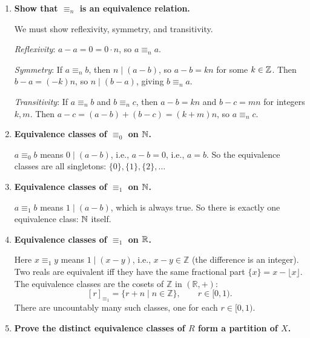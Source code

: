 \begin{enumerate}[{0.}1. ]
\begin{enumerate}
\item $\leq$ is $=\cup<$, which is the set computed in part (c).
\end{enumerate}

\item \textbf{Show that $\equiv_n$ is an equivalence relation.}

We must show reflexivity, symmetry, and transitivity.

\textit{Reflexivity}: $a - a = 0 = 0 \cdot n$, so $a \equiv_n a$.

\textit{Symmetry}: If $a \equiv_n b$, then $n \mid (a-b)$, so $a - b = kn$ for some $k \in \mathbb{Z}$. Then $b - a = (-k)n$, so $n \mid (b-a)$, giving $b \equiv_n a$.

\textit{Transitivity}: If $a \equiv_n b$ and $b \equiv_n c$, then $a - b = kn$ and $b - c = mn$ for integers $k,m$. Then $a - c = (a-b)+(b-c) = (k+m)n$, so $a \equiv_n c$.

\item \textbf{Equivalence classes of $\equiv_0$ on $\mathbb{N}$.}

$a \equiv_0 b$ means $0 \mid (a-b)$, i.e., $a - b = 0$, i.e., $a = b$. So the equivalence classes are all singletons: $\{0\}, \{1\}, \{2\}, \ldots$

\item \textbf{Equivalence classes of $\equiv_1$ on $\mathbb{N}$.}

$a \equiv_1 b$ means $1 \mid (a - b)$, which is always true. So there is exactly one equivalence class: $\mathbb{N}$ itself.

\item \textbf{Equivalence classes of $\equiv_1$ on $\mathbb{R}$.}

Here $x \equiv_1 y$ means $1 \mid (x-y)$, i.e., $x - y \in \mathbb{Z}$ (the difference is an integer).
Two reals are equivalent iff they have the same fractional part $\{x\} = x - \lfloor x\rfloor$.
The equivalence classes are the cosets of $\mathbb{Z}$ in $(\mathbb{R},+)$:
\[
  [r]_{\equiv_1} = \{r + n \mid n \in \mathbb{Z}\}, \qquad r \in [0,1).
\]
There are uncountably many such classes, one for each $r \in [0,1)$.

\item \textbf{Prove the distinct equivalence classes of $R$ form a partition of $X$.}


\end{enumerate}
